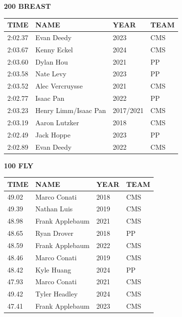 \begin{table}[H]
\centering
\begin{minipage}[t]{0.48\textwidth}
\centering
\textbf{200 BREAST}\\[0.1cm]
\begin{tabular}{@{}p{1.8cm}p{2.8cm}p{1.2cm}p{1.4cm}@{}}
\hline
    \textbf{TIME} & \textbf{NAME} & \textbf{YEAR} & \textbf{TEAM} \\
\hline
    2:02.37 & Evan Deedy & 2023 & CMS \\
    2:03.67 & Kenny Eckel & 2024 & CMS \\
    2:03.60 & Dylan Hou & 2021 & PP \\
    2:03.58 & Nate Levy & 2023 & PP \\
    2:03.52 & Alec Vercruysse & 2021 & CMS \\
    2:02.77 & Isaac Pan & 2022 & PP \\
    2:03.23 & Henry Limm/Isaac Pan & 2017/2021 & CMS \\
    2:03.19 & Aaron Lutzker & 2018 & CMS \\
    2:02.49 & Jack Hoppe & 2023 & PP \\
    2:02.89 & Evan Deedy & 2022 & CMS \\
\hline
\end{tabular}
\end{minipage}\hfill
\begin{minipage}[t]{0.48\textwidth}
\centering
\textbf{100 FLY}\\[0.1cm]
\begin{tabular}{@{}p{1.8cm}p{2.8cm}p{1.2cm}p{1.4cm}@{}}
\hline
    \textbf{TIME} & \textbf{NAME} & \textbf{YEAR} & \textbf{TEAM} \\
\hline
    49.02 & Marco Conati & 2018 & CMS \\
    49.39 & Nathan Luis & 2019 & CMS \\
    48.98 & Frank Applebaum & 2021 & CMS \\
    48.65 & Ryan Drover & 2018 & PP \\
    48.59 & Frank Applebaum & 2022 & CMS \\
    48.46 & Marco Conati & 2019 & CMS \\
    48.42 & Kyle Huang & 2024 & PP \\
    47.93 & Marco Conati & 2021 & CMS \\
    49.42 & Tyler Headley & 2024 & CMS \\
    47.41 & Frank Applebaum & 2023 & CMS \\
\hline
\end{tabular}
\end{minipage}
\end{table}

